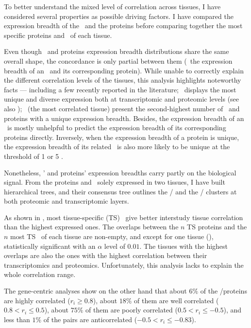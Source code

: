 To better understand the mixed level of correlation across tissues,
I have considered several properties as possible driving factors.
I have compared the expression breadth of the \mRNAs\ and the proteins
before comparing together the most specific proteins and \mRNAs\ of each tissue.\mybr\

Even though \mRNAs\ and proteins expression breadth distributions share
the same overall shape,
the concordance is only partial between them
(\ie\ the expression breadth of an \mRNA\ and its corresponding protein).
While unable to correctly explain the different correlation levels of the tissues,
this analysis highlights noteworthy facts
--- including a few recently reported in the literature;
\testis\ displays the most unique and diverse expression
both at transcriptomic and proteomic levels
(see also \citet{Wang2019-ut,Zhang2015-yn});
\liver\ (the most correlated tissue) present the second-highest number
of \mRNAs\ and proteins with a unique expression breadth.
Besides, the expression breadth of an \mRNA\ is mostly unhelpful
to predict the expression breadth of its corresponding proteins directly.
Inversely, when the expression breadth of a protein is unique,
the expression breadth of its related \mRNA\ is also more likely to be unique
at the threshold of 1 or 5 \FPKM{}.

Nonetheless, \mRNAs{}' and proteins' expression breadths carry partly on
the biological signal.
From the proteins and \mRNAs\ solely expressed in two tissues,
I have built hierarchical trees,
and their consensus tree outlines
the \ovary{}/\testis{} and the \kidney{}/\liver{} clusters
at both proteomic and transcriptomic layers.\mybr\

As shown in ,
most tissue-specific (\gls{TS}) \mRNAs\ give better
interstudy tissue correlation
than the highest expressed ones.
The overlaps between the $n$ \gls{TS} proteins and
the $n$ most \gls{TS} \mRNAs\ of each tissue are non-empty,
and except for one tissue (),
statistically significant with an $\alpha$ level of $0.01$.
The tissues with the highest overlaps are
also the ones with the highest correlation
between their transcriptomics and proteomics.
Unfortunately, this analysis lacks to explain
the whole correlation range.\mybr\

The gene-centric analyses show on the other hand that
about $6\%$ of the \mRNAs/proteins are highly correlated ($r_i≥0.8$),
about $18\%$ of them are well correlated ($0.8 < r_i ≤ 0.5$),
about $75\%$ of them are poorly correlated ($0.5 < r_i ≤ -0.5$), and
less than $1\%$ of the pairs are anticorrelated ($-0.5 < r_i ≤ -0.83$).

